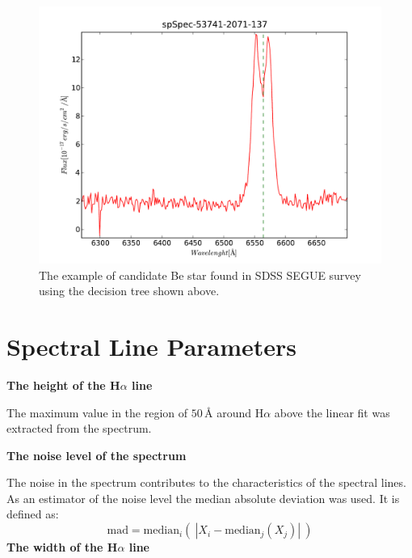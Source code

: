 \documentclass[11pt,twoside]{article}
\begin{document}
\begin{center}
\begin{figure}[!htbp]
  \begin{center}
    \leavevmode
    \includegraphics[scale = .6]{result1}
    \caption{The example of candidate Be star found in SDSS
      SEGUE survey using the decision tree shown above.}
    \label{FigConvolution}
  \end{center}
\end{figure}

\end{center}


%
%

\section{Spectral Line Parameters}

\textbf{The height of the H$\alpha$ line}

The maximum value in the region of $50\,\textrm{\AA}$ around H$\alpha$
above the linear fit was extracted from the spectrum.

\textbf{The noise level of the spectrum}

The noise in the spectrum contributes to the characteristics of the
spectral lines. As an estimator of the noise level the median
absolute deviation was used. It is defined as:
%
\begin{equation}
  \textrm{mad} = \textrm{median}_{i}\left(\ \left| X_{i} -
      \textrm{median}_{j} (X_{j}) \right|\ \right)
\end{equation}
%
\textbf{The width of the H$\alpha$ line}
\end{document}

